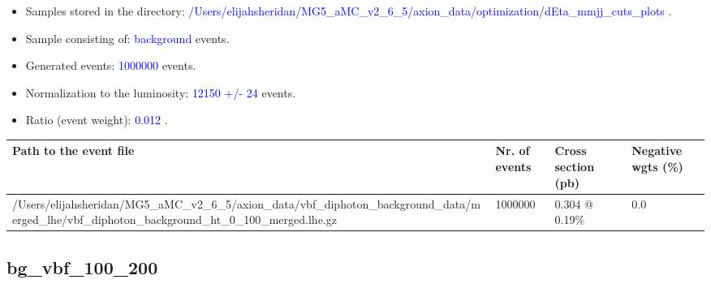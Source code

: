 \documentclass[a4paper, 10pt]{article}
\begin{document}
\begin{itemize}
  \item Samples stored in the directory: \textcolor{blue}{/\-Users/\-elijahsheridan/\-MG5\_aMC\_v2\_6\_5/\-axion\_data/\-optimization/\-dEta\_mmjj\_cuts\_plots} .
   \item Sample consisting of: \textcolor{blue}{background}  events.
   \item Generated events: \textcolor{blue}{1000000 }  events.
   \item Normalization to the luminosity: \textcolor{blue}{12150}\textcolor{blue}{ +/\-- }\textcolor{blue}{24 }  events.
   \item Ratio (event weight): \textcolor{blue}{0.012 } .  
 
\end{itemize}
\begin{table}[H]
  \begin{center}
    \begin{tabular}{|m{55.0mm}|m{25.0mm}|m{30.0mm}|m{30.0mm}|}
      \hline
      {\cellcolor{yellow}         Path to the event file}& {\cellcolor{yellow}         Nr. of events}& {\cellcolor{yellow}         Cross section (pb)}& {\cellcolor{yellow}         Negative wgts (\%)}\\
      \hline
      {\cellcolor{white}          /\-Users/\-elijahsheridan/\-MG5\_aMC\_v2\_6\_5/\-axion\_data/\-vbf\_diphoton\_background\_data/\-merged\_lhe/\-vbf\_diphoton\_background\_ht\_0\_100\_merged.lhe.gz}& {\cellcolor{white}          1000000}& {\cellcolor{white}          0.304 @ 0.19\%}& {\cellcolor{white}          0.0}\\
\hline
    \end{tabular}
  \end{center}
\end{table}

\subsection{ bg\_vbf\_100\_200}
\end{document}
